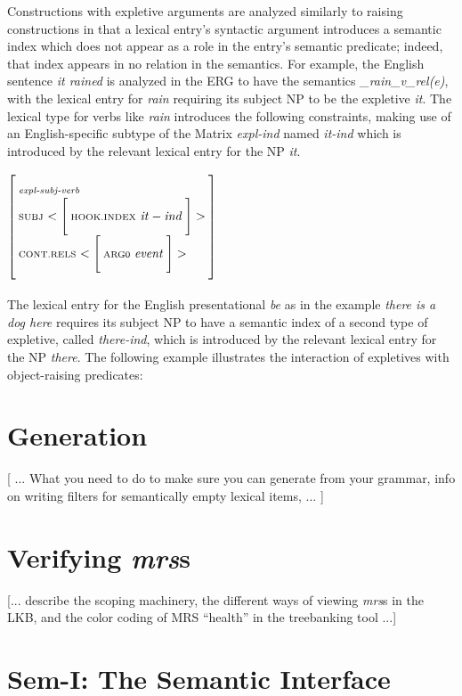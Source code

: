 \documentclass[12pt]{article}
\newcommand{\avmplus}[1]{{\setlength{\arraycolsep}{0.8mm}	
                       \renewcommand{\arraystretch}{1.1} %
                       \left[ 			
                       \begin{array}{l}
                       \\[-2mm] #1 \\[-2mm] \\
                       \end{array} 		
                       \right]
                    }}
\newcommand{\att}[1]{{\mbox{\scriptsize {\bf #1}}}}
\newcommand{\attval}[2]{{\mbox{\scriptsize #1}\ {{#2}}}}
\newcommand{\attvallist}[2]{{\mbox{\scriptsize #1}\ {<{#2}>}}}
\begin{document}
Constructions with expletive arguments are analyzed similarly to raising
constructions in that a lexical entry's syntactic argument introduces a
semantic index which does not appear as a role in the entry's semantic
predicate; indeed, that index appears in no relation in the semantics.
For example, the English sentence {\it it rained} is analyzed in the ERG
to have the semantics {\it \_rain\_v\_rel(e)}, with the lexical entry for
{\it rain} requiring its subject NP to be the expletive {\it it}.  The
lexical type for verbs like {\it rain} introduces the following constraints,
making use of an English-specific subtype of the Matrix {\it expl-ind} named
{\it it-ind} which is introduced by the relevant lexical entry for the NP
{\it it}.

$\avmplus{\att{\it expl-subj-verb}\\
          \attvallist{SUBJ}{
          \avmplus{\attval{HOOK.INDEX}{\it it-ind}}}\\
          \attvallist{CONT.RELS}{
          \avmplus{\attval{ARG0}{\it event}}}}$

The lexical entry for the English presentational {\it be} as in the example
{\it there is a dog here} requires its subject NP to have a semantic index
of a second type of expletive, called {\it there-ind}, which is introduced
by the relevant lexical entry for the NP {\it there}.  The following example
illustrates the interaction of expletives with object-raising predicates:



\section{Generation}
\label{gen}

[ ... What you need to do to make sure you can generate from your
grammar, info on writing filters for semantically empty lexical items, ... ] 

\section{Verifying {\it mrs}s}
\label{verif}

[... describe the scoping machinery, the different ways of viewing
{\it mrs}s in the LKB, and the color coding of MRS ``health'' in the
treebanking tool ...]

\section{Sem-I: The Semantic Interface}
\label{semisec}
\end{document}
